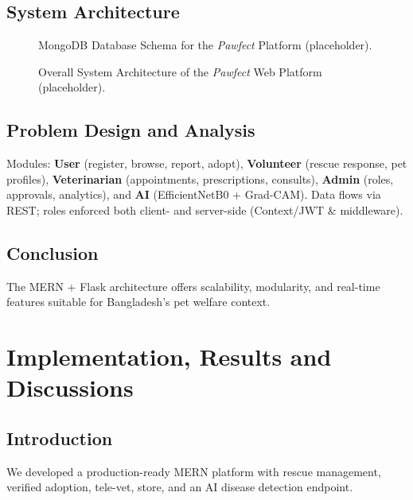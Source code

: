 \documentclass[12pt,a4paper]{report}
\numberwithin{figure}{chapter}
\numberwithin{table}{chapter}
\begin{document}
\section{System Architecture}
\begin{figure}[H]
  \centering
  \caption{MongoDB Database Schema for the \textit{Pawfect} Platform (placeholder).}
  \label{fig:dbschema}
\end{figure}

\begin{figure}[H]
  \centering
  \caption{Overall System Architecture of the \textit{Pawfect} Web Platform (placeholder).}
  \label{fig:system-architecture}
\end{figure}

\section{Problem Design and Analysis}
Modules: \textbf{User} (register, browse, report, adopt), \textbf{Volunteer} (rescue response, pet profiles), \textbf{Veterinarian} (appointments, prescriptions, consults), \textbf{Admin} (roles, approvals, analytics), and \textbf{AI} (EfficientNetB0 + Grad-CAM). Data flows via REST; roles enforced both client- and server-side (Context/JWT \& middleware).

\section{Conclusion}
The MERN + Flask architecture offers scalability, modularity, and real-time features suitable for Bangladesh’s pet welfare context.

\chapter{Implementation, Results and Discussions}\label{chap:impl}

\section{Introduction}
We developed a production-ready MERN platform with rescue management, verified adoption, tele-vet, store, and an AI disease detection endpoint.
\end{document}
